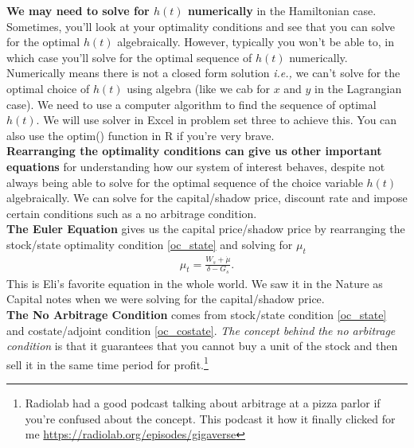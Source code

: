 \documentclass{article}
\begin{document}
\textbf{We may need to solve for $h(t)$ numerically} in the Hamiltonian case. Sometimes, you'll look at your optimality conditions and see that you can solve for the optimal $h(t)$ algebraically. However, typically you won't be able to, in which case you'll solve for the optimal sequence of $h(t)$ numerically. Numerically means there is not a closed form solution \textit{i.e.,} we can't solve for the optimal choice of $h(t)$ using algebra (like we cab for $x$ and $y$ in the Lagrangian case). We need to use a computer algorithm to find the sequence of optimal $h(t)$. We will use solver in Excel in problem set three to achieve this. You can also use the optim() function in R if you're very brave.\\

\textbf{Rearranging the optimality conditions can give us other important equations} for understanding how our system of interest behaves, despite not always being able to solve for the optimal sequence of the choice variable $h(t)$ algebraically.  We can solve for the capital/shadow price, discount rate and impose certain conditions such as a no arbitrage condition.\\


\textbf{The Euler Equation} gives us the capital price/shadow price by rearranging the stock/state optimality condition \ref{oc_state} and solving for $\mu_t$
\begin{align}
    \mu_t = \frac{W_s + \dot \mu}{\delta - G_s}. 
    \label{euler}
\end{align}
This is Eli's favorite equation in the whole world. We saw it in the Nature as Capital notes when we were solving for the capital/shadow price. \\

\textbf{The No Arbitrage Condition} comes from stock/state condition \ref{oc_state} and costate/adjoint condition \ref{oc_costate}. \textit{The concept behind the no arbitrage condition} is that it guarantees that you cannot buy a unit of the stock and then sell it in the same time period for profit.\footnote{Radiolab had a good podcast talking about arbitrage at a pizza parlor if you're confused about the concept. This podcast it how it finally clicked for me \url{https://radiolab.org/episodes/gigaverse}}\\
\end{document}
